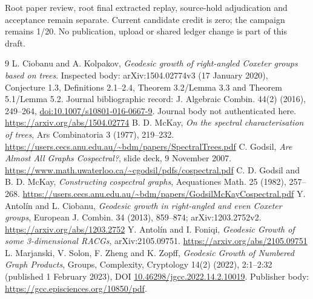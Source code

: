 \documentclass[11pt]{article}
\begin{document}
Root paper review, root final extracted replay, source-hold adjudication and acceptance remain separate. Current candidate credit is zero; the campaign remains 1/20. No publication, upload or shared ledger change is part of this draft.
\newpage
\begin{thebibliography}{9}
 L. Ciobanu and A. Kolpakov, \emph{Geodesic growth of right-angled Coxeter groups based on trees}. Inspected body: arXiv:1504.02774v3 (17 January 2020), Conjecture 1.3, Definitions 2.1--2.4, Theorem 3.2/Lemma 3.3 and Theorem 5.1/Lemma 5.2. Journal bibliographic record: J. Algebraic Combin. 44(2) (2016), 249--264, \href{https://doi.org/10.1007/s10801-016-0667-9}{doi:10.1007/s10801-016-0667-9}. Journal body not authenticated here. \url{https://arxiv.org/abs/1504.02774}
 B. D. McKay, \emph{On the spectral characterisation of trees}, Ars Combinatoria 3 (1977), 219--232. \url{https://users.cecs.anu.edu.au/~bdm/papers/SpectralTrees.pdf}
 C. Godsil, \emph{Are Almost All Graphs Cospectral?}, slide deck, 9 November 2007. \url{https://www.math.uwaterloo.ca/~cgodsil/pdfs/cospectral.pdf}
 C. D. Godsil and B. D. McKay, \emph{Constructing cospectral graphs}, Aequationes Math. 25 (1982), 257--268. \url{https://users.cecs.anu.edu.au/~bdm/papers/GodsilMcKayCospectral.pdf}
 Y. Antol\'in and L. Ciobanu, \emph{Geodesic growth in right-angled and even Coxeter groups}, European J. Combin. 34 (2013), 859--874; arXiv:1203.2752v2. \url{https://arxiv.org/abs/1203.2752}
 Y. Antol\'in and I. Foniqi, \emph{Geodesic Growth of some 3-dimensional RACGs}, arXiv:2105.09751. \url{https://arxiv.org/abs/2105.09751}
 L. Marjanski, V. Solon, F. Zheng and K. Zopff, \emph{Geodesic Growth of Numbered Graph Products}, Groups, Complexity, Cryptology 14(2) (2022), 2:1--2:32 (published 1 February 2023), DOI \href{https://doi.org/10.46298/jgcc.2022.14.2.10019}{10.46298/jgcc.2022.14.2.10019}. Publisher body: \url{https://gcc.episciences.org/10850/pdf}.
\end{thebibliography}
\end{document}
